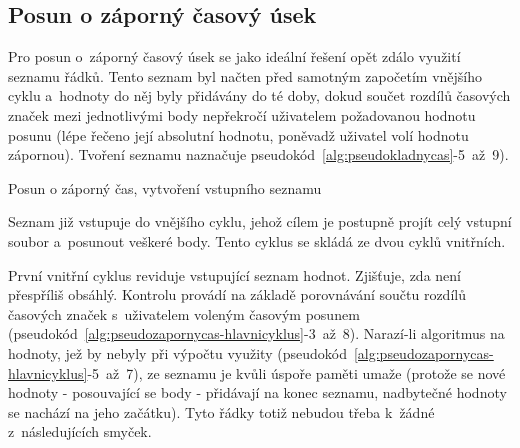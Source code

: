 \subsection{Posun o záporný časový úsek}
\label{zapornycas}

Pro posun o~záporný časový úsek se jako ideální řešení opět zdálo využití seznamu řádků.
Tento seznam byl načten před samotným započetím vnějšího cyklu a~hodnoty do něj byly
přidávány do té doby, dokud součet rozdílů časových značek mezi jednotlivými body
nepřekročí uživatelem požadovanou hodnotu posunu (lépe řečeno její absolutní hodnotu,
poněvadž uživatel volí hodnotu zápornou). Tvoření seznamu naznačuje
pseudokód~\ref{alg:pseudokladnycas}-5~až~9). 

\begin{algorithm}
    \caption{Posun o záporný čas, vytvoření vstupního seznamu}
    \label{alg:pseudozapornycas-vstup}
    \begin{algorithmic}[1]
    \ENDWHILE
    \end{algorithmic}
\end{algorithm}

Seznam již vstupuje do vnějšího cyklu, jehož cílem je postupně projít celý vstupní
soubor a~posunout veškeré body. Tento cyklus se skládá ze dvou cyklů vnitřních. 

První vnitřní cyklus reviduje vstupující seznam hodnot. Zjišťuje, zda není přes\-příliš obsáhlý.
Kontrolu provádí na základě porovnávání součtu rozdílů časových značek s~uživatelem
voleným časovým posunem (pseudokód~\ref{alg:pseudozapornycas-hlavnicyklus}-3~až~8).
Narazí-li algoritmus na hodnoty, jež by nebyly při výpočtu využity
(pseudokód~\ref{alg:pseudozapornycas-hlavnicyklus}-5~až~7), ze seznamu je kvůli úspoře
paměti umaže (protože se nové hodnoty - posouvající se body - přidávají
na konec seznamu, nadbytečné hodnoty se nachází na jeho začátku). Tyto řádky totiž nebudou
třeba k~žádné z~následujících smyček. 

